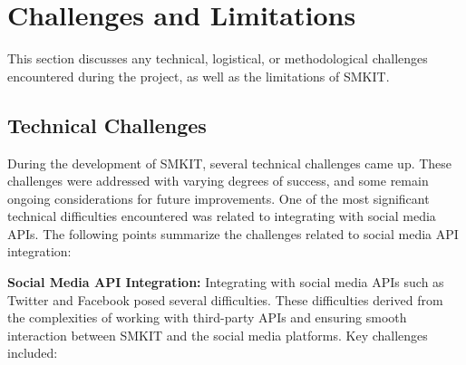 \section{Challenges and Limitations}
\label{sec:challenges_and_limitations}
This section discusses any technical, logistical, or methodological challenges encountered during the project, as well as the limitations of SMKIT.

\subsection{Technical Challenges}
\label{subsec:technical_challenges}
During the development of SMKIT, several technical challenges came up. These challenges were addressed with varying degrees of success, and some remain ongoing considerations for future improvements. One of the most significant technical difficulties encountered was related to integrating with social media APIs. The following points summarize the challenges related to social media API integration:

\textbf{Social Media API Integration:} Integrating with social media APIs such as Twitter and Facebook posed several difficulties. These difficulties derived from the complexities of working with third-party APIs and ensuring smooth interaction between SMKIT and the social media platforms. Key challenges included:

